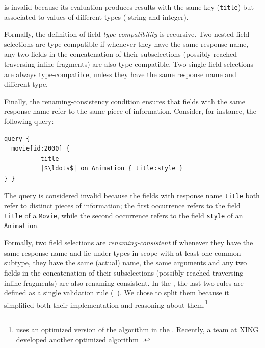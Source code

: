 \medskip

\noindent is invalid because its evaluation produces results with the same key 
(\texttt{title}) but associated to values of different types (\ie
string and integer).

Formally, the definition of field \emph{type-compatibility} is
recursive. Two nested field selections are type-compatible if whenever
they have the same response name, any two fields in the concatenation
of their subselections (possibly reached traversing inline fragments)
are also type-compatible. Two single field selections are always
type-compatible, unless they have the same response name and
different %
type.

Finally, the renaming-consistency condition ensures that fields with
the same response name refer to the same piece of
information. Consider, for instance, the following query:
\begin{verbatim}
query { 
  movie[id:2000] {
          title   
          |$\ldots$| on Animation { title:style } 
} }
\end{verbatim}

\noindent The query is considered invalid because the fields with response name \texttt{title} both refer to distinct pieces of information;
the first occurrence refers to the field \texttt{title} of a \texttt{Movie}, while the second
occurrence refers to the field \texttt{style} of an \texttt{Animation}.


Formally, two field selections are \emph{renaming-consistent} if
whenever they have the same response name and lie under types in scope
with at least one common subtype,
they have the same (actual) name, the same arguments and any two
fields in the concatenation of their subselections (possibly reached
traversing inline fragments) are also renaming-consistent.
%
In the \spec, the last two rules are defined as a single validation
rule (\cf~\cite[\S5.3.2]{gqlspec}). 
%
We chose to split them because it simplified both their implementation and reasoning about them.\footnote{\gcoql uses an optimized
  version of the algorithm in the \spec. Recently, a team at XING
  developed another optimized algorithm~\cite{xingalg}.}

